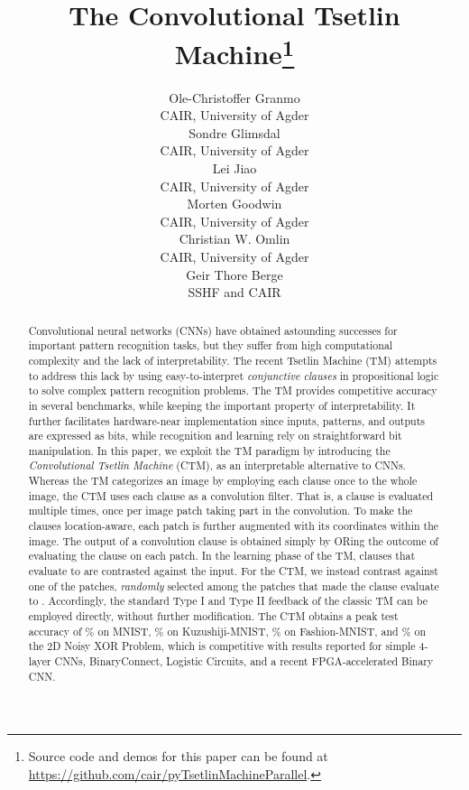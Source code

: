 \documentclass{article}
\title{The Convolutional Tsetlin Machine\thanks{Source code and demos for this paper can be found at \href{https://github.com/cair/pyTsetlinMachineParallel}{https://github.com/cair/pyTsetlinMachineParallel}.}}
\author{
 Ole-Christoffer Granmo\\
 CAIR, University of Agder\\
\And
  Sondre Glimsdal\\
  CAIR, University of Agder\\
\And
  Lei Jiao\\
  CAIR, University of Agder\\
\And
  Morten Goodwin\\
  CAIR, University of Agder\\
\And
  Christian W. Omlin\\
  CAIR, University of Agder\\
\And
  Geir Thore Berge\\
  SSHF and CAIR\\
}
\begin{document}
\maketitle

\begin{abstract}
Convolutional neural networks (CNNs) have obtained astounding successes for important pattern recognition tasks, but they suffer from high computational complexity and the lack of interpretability. The recent Tsetlin Machine (TM) attempts to address this lack by using easy-to-interpret \emph{conjunctive clauses} in propositional logic to solve complex pattern recognition problems. The TM provides competitive accuracy in several benchmarks, while keeping the important property of interpretability. It further facilitates hardware-near implementation since inputs, patterns, and outputs are expressed as bits, while recognition and learning rely on straightforward bit manipulation. In this paper, we exploit the TM paradigm by introducing the \emph{Convolutional Tsetlin Machine} (CTM), as an interpretable alternative to CNNs. Whereas the TM categorizes an image by employing each clause once to the whole image, the CTM uses each clause as a convolution filter. That is, a clause is evaluated multiple times, once per image patch taking part in the convolution. To make the clauses location-aware, each patch is further augmented with its coordinates within the image. The output of a convolution clause is obtained simply by ORing the outcome of evaluating the clause on each patch. In the learning phase of the TM, clauses that evaluate to  are contrasted against the input. For the CTM, we instead contrast against one of the patches, \emph{randomly} selected among the patches that made the clause evaluate to . Accordingly, the standard Type I and Type II feedback of the classic TM can be employed directly, without further modification. The CTM obtains a peak test accuracy of \% on MNIST, \% on Kuzushiji-MNIST, \% on Fashion-MNIST, and \% on the 2D Noisy XOR Problem, which is competitive with results reported for simple 4-layer CNNs, BinaryConnect, Logistic Circuits, and a recent FPGA-accelerated Binary CNN. 
\end{abstract}
\end{document}
